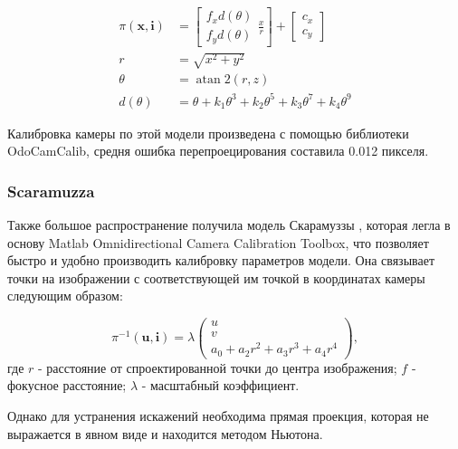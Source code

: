 \begin{equation}
\begin{aligned}
	\pi(\mathbf{x}, \mathbf{i}) &=\left[\begin{array}{l}
	f_{x} d(\theta) \\
	f_{y} d(\theta)
	\end{array} \frac{x}{r}\right]+\left[\begin{array}{c}
	c_{x} \\
	c_{y}
	\end{array}\right] \\
	r &=\sqrt{x^{2}+y^{2}} \\
	\theta &=\operatorname{atan} 2(r, z) \\
	d(\theta) &=\theta+k_{1} \theta^{3}+k_{2} \theta^{5}+k_{3} \theta^{7}+k_{4} \theta^{9}
\end{aligned}
\end{equation}

Калибровка камеры по этой модели произведена с помощью библиотеки OdoCamCalib, средня ошибка перепроецирования 
составила 0.012 пикселя. 

\subsubsection{Scaramuzza}

Также большое распространение получила модель Скарамуззы \cite{scaramuzza}, которая легла в основу Matlab Omnidirectional 
Camera Calibration Toolbox, что позволяет быстро и удобно производить калибровку параметров модели.  Она связывает точки 
на изображении с соответствующей им точкой в координатах камеры следующим образом:

\begin{equation}	
    \pi^{-1}(\mathbf{u}, \mathbf{i}) = \lambda \begin{pmatrix}u\\v\\a_0 + a_2 r^2 + a_3 r^3 + a_4 r^4\end{pmatrix},
    \label{eqn:scaramuzza}
\end{equation}
где  $r$ - расстояние от спроектированной точки до центра изображения; $f$ - фокусное расстояние; $\lambda$ - масштабный коэффициент.

Однако для устранения искажений необходима прямая проекция, которая не выражается в явном виде  и находится методом 
Ньютона. 

